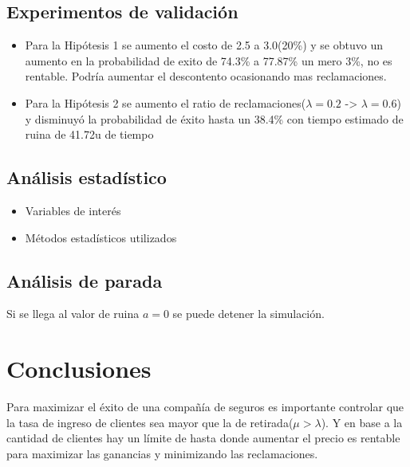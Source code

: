 \documentclass[12pt, a4paper]{article}
\begin{document}
\subsection*{Experimentos de validación}
\begin{itemize}
    \item Para la Hipótesis 1 se aumento el costo de 2.5 a 3.0(20\%) y se obtuvo un aumento en la probabilidad de exito de 74.3\% a 77.87\% un mero 3\%, no es rentable. Podría aumentar el descontento ocasionando mas reclamaciones.
    \item Para la Hipótesis 2 se aumento el ratio de reclamaciones($\lambda = 0.2$ -> $\lambda = 0.6$) y disminuyó la probabilidad de éxito hasta un 38.4\% con tiempo estimado de ruina de 41.72u de tiempo
\end{itemize}

\subsection*{Análisis estadístico}
\begin{itemize}
    \item Variables de interés
    \item Métodos estadísticos utilizados
\end{itemize}

\subsection*{Análisis de parada}
Si se llega al valor de ruina $a=0$ se puede detener la simulación. 

\section{Conclusiones} 
Para maximizar el éxito de una compañía de seguros es importante controlar que la tasa de ingreso de clientes sea mayor que la de retirada($\mu > \lambda$). Y en base a la cantidad de clientes
hay un límite de hasta donde aumentar el precio es rentable para maximizar las ganancias y minimizando las reclamaciones. 
\end{document}
